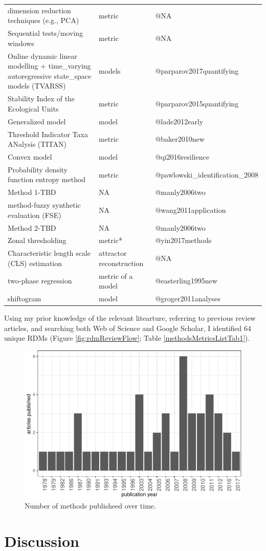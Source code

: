 \documentclass[12pt,twoside,openany]{reedthesis}
\begin{document}
\begin{longtable}{lll}
dimension reduction techniques (e.g., PCA) & metric & @NA\\
\addlinespace
Sequential tests/moving windows & metric & @NA\\
Online dynamic linear modelling +  time\_varying autoregressive state\_space models (TVARSS) & models & @parparov2017quantifying\\
Stability Index of the Ecological Units & metric & @parparov2015quantifying\\
Generalized model & model & @lade2012early\\
Threshold Indicator Taxa ANalysis (TITAN) & metric & @baker2010new\\
\addlinespace
Convex model & model & @qi2016resilience\\
Probability density function entropy method & metric & @pawlowski\_identification\_2008\\
Method 1-TBD & NA & @manly2006two\\
method-fuzzy synthetic evaluation (FSE) & NA & @wang2011application\\
Method 2-TBD & NA & @manly2006two\\
\addlinespace
Zonal thresholding & metric* & @yin2017methods\\
Characteristic length scale (CLS) estimation & attractor reconstruction & @NA\\
two-phase regression & metric of a model & @easterling1995new\\
shiftogram & model & @groger2011analyses\\*
\end{longtable}
Using my prior knowledge of the relevant litearture, referring to previous review articles, and searching both Web of Science and Google Scholar, I identified 64 unique RDMs (Figure \ref{fig:rdmReviewFlow}; Table \ref{methodsMetricsListTab1}).
\begin{figure}
\centering
\includegraphics{_myDissertation_files/figure-latex/jrnlYearFig-1.pdf}
\caption{\label{fig:jrnlYearFig}Number of methods publisheed over time.}
\end{figure}
\hypertarget{discussion}{%
\section{Discussion}\label{discussion}}
\end{document}
